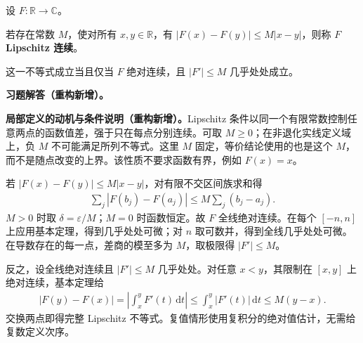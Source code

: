 \documentclass[../../main.tex]{subfiles}%
\begin{document}

\begin{exercise}\label{exercise:ch03-lipschitz-ac}
设 $F:\mathbb R\to\mathbb C$。
\begin{definition*}[Lipschitz 连续]
若存在常数 $M$，使对所有 $x,y\in\mathbb R$，有 $|F(x)-F(y)|\le M|x-y|$，则称 $F$ \textbf{Lipschitz 连续}。
\end{definition*}
这一不等式成立当且仅当 $F$ 绝对连续，且 $|F'|\le M$ 几乎处处成立。
\end{exercise}
\begin{solution}
\label{solution:ch03-lipschitz-ac}
\textbf{习题解答（重构新增）。}\begin{remark}
\textbf{局部定义的动机与条件说明（重构新增）。}Lipschitz 条件以同一个有限常数控制任意两点的函数值差，强于只在每点分别连续。可取 $M\ge0$；在非退化实线定义域上，负 $M$ 不可能满足所列不等式。这里 $M$ 固定，等价结论使用的也是这个 $M$，而不是随点改变的上界。该性质不要求函数有界，例如 $F(x)=x$。
\end{remark}
若 $|F(x)-F(y)|\le M|x-y|$，对有限不交区间族求和得
\begin{align*}
\sum_j|F(b_j)-F(a_j)|\le M\sum_j(b_j-a_j).
\end{align*}
$M>0$ 时取 $\delta=\varepsilon/M$；$M=0$ 时函数恒定。故 $F$ 全线绝对连续。在每个 $[-n,n]$ 上应用基本定理，得到几乎处处可微；对 $n$ 取可数并，得到全线几乎处处可微。在导数存在的每一点，差商的模至多为 $M$，取极限得 $|F'|\le M$。

反之，设全线绝对连续且 $|F'|\le M$ 几乎处处。对任意 $x<y$，其限制在 $[x,y]$ 上绝对连续，基本定理给
\begin{align*}
|F(y)-F(x)|=\left|\int_x^yF'(t)\,\mathrm dt\right|
\le\int_x^y|F'(t)|\,\mathrm dt\le M(y-x).
\end{align*}
交换两点即得完整 Lipschitz 不等式。复值情形使用复积分的绝对值估计，无需给复数定义次序。
\end{solution}
\end{document}
